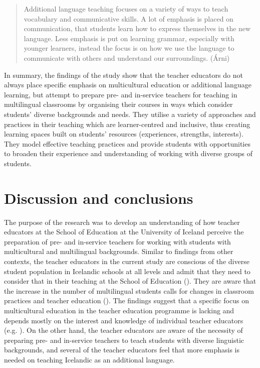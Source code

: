 \documentclass[output=paper]{langscibook}
\begin{document}
\begin{quote}
Additional language teaching focuses on a variety of ways to teach vocabulary and communicative skills. A lot of emphasis is placed on communication, that students learn how to express themselves in the new language. Less emphasis is put on learning grammar, especially with younger learners, instead the focus is on how we use the language to communicate with others and understand our surroundings. (Árni)
\end{quote}

In summary, the findings of the study show that the teacher educators do not always place specific emphasis on multicultural education or additional language learning, but attempt to prepare pre- and in-service teachers for teaching in multilingual classrooms by organising their courses in ways which consider students’ diverse backgrounds and needs. They utilise a variety of approaches and practices in their teaching which are learner-centred and inclusive, thus creating learning spaces built on students' resources (experiences, strengths, interests). They model effective teaching practices and provide students with opportunities to broaden their experience and understanding of working with diverse groups of students.

\section{Discussion and conclusions}

The purpose of the research was to develop an understanding of how teacher educators at the School of Education at the University of Iceland perceive the preparation of pre- and in-service teachers for working with students with multicultural and multilingual backgrounds. {Similar to findings from other contexts, the teacher educators in the current study are conscious of the diverse student population in Icelandic schools at all levels and admit that they need to consider that in their teaching at the School of Education} (\citealt{FlocktonCunningham2021,PaulsrudEtAl2023}){. They are aware that the increase in the number of} multilingual students calls for changes in classroom practices and teacher education (\citealt{Day2010-1}). The findings suggest that a specific focus on multicultural education in the teacher education programme is lacking and depends mostly on the interest and knowledge of individual teacher educators (e.g. \citealt{PaulsrudEtAl2023}). On the other hand, the teacher educators are aware of the necessity of preparing pre- and in-service teachers to teach students with diverse linguistic backgrounds, and several of the teacher educators feel that more emphasis is needed on teaching Icelandic as an additional language.
\end{document}
